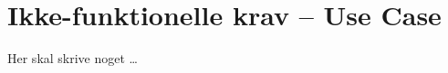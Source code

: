 \documentclass[Main]{subfiles}
\begin{document}
\chapter{Ikke-funktionelle krav -- Use Case}
Her skal skrive noget \dots
\end{document}
